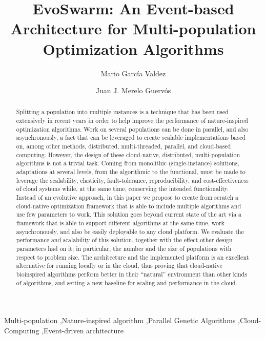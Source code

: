 \documentclass[review]{elsarticle}
\begin{document}
\lstset{language=Python} 
\begin{frontmatter}

\title{EvoSwarm: An Event-based Architecture for Multi-population Optimization Algorithms}

\author[itt]{Mario Garc\'ia Valdez}

\author[granada]{Juan J. Merelo Guerv\'os}

\address[itt]{Department of Graduate Studies, Instituto Tecnol\'ogico de Tijuana, Tijuana BC, Mexico}
\address[granada]{Department of Computer Architecture and Technology, Universidad de Granada, Granada, Spain}

\begin{abstract} 
Splitting a population into multiple instances is a technique that has
been used extensively in recent years in order to help improve the
performance of nature-inspired optimization algorithms. Work on
several populations can be done in parallel, and also asynchronously,
a fact that can be leveraged to create scalable implementations based
on, among other methods, distributed, multi-threaded, parallel, and
cloud-based computing.  However, the design of these cloud-native,
distributed, multi-population algorithms is not a trivial task. Coming
from monolithic (single-instance) solutions, adaptations at several
levels, from the algorithmic to the functional, must be made to
leverage the scalability, elasticity, fault-tolerance,
reproducibility, and cost-effectiveness of cloud systems while, at the
same time, conserving the intended functionality. Instead of an
evolutive approach, in this paper we propose to create from scratch a
cloud-native optimization framework that is able to include multiple
algorithms and use few parameters to work. This solution goes beyond
current state of the art via a framework that is able to support
different algorithms at the same time, work asynchronously, and also
be easily deployable to any cloud platform. We evaluate the
performance and scalability of this solution, together with the effect
other design parameters had on it; in particular, the number and the
size of populations with respect to problem size. The architecture and
the implemented platform is an excellent alternative for running
locally or in the cloud, thus proving that cloud-native bioinspired
algorithms perform better in their ``natural'' environment than other
kinds of algorithms, and setting a new baseline for scaling and
performance in the cloud.
\end{abstract}

\begin{keyword}
Multi-population \sep Nature-inspired algorithm \sep Parallel Genetic Algorithms \sep Cloud-Computing
\sep Event-driven architecture 
\end{keyword}

\end{frontmatter}
\end{document}
